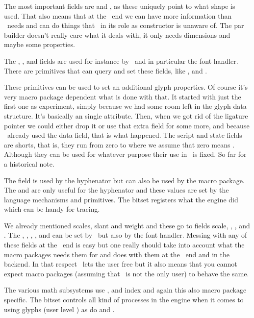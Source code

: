 {The most important fields are  and , as these
uniquely point to what shape is used. That also means that at the \LUA\ end we
can have more information than \TEX\ needs and can do things that \TEX\ in its
role as constructor is unaware of. The par builder doesn't really care what it
deals with, it only needs dimensions and maybe some properties.

The , ,  and  fields are
used for instance by \CONTEXT\ and in particular the font handler. There are
primitives that can query and set these fields, like \typ {\glyphdatafield}, \typ
{\glyphscriptfield} and \typ {\glyphstatefield}.

These primitives can be used to set an additional glyph properties. Of course
it's very macro package dependent what is done with that. It started with just
the first one as experiment, simply because we had some room left in the glyph
data structure. It's basically an single attribute. Then, when we got rid of the
ligature pointer we could either drop it or use that extra field for some more,
and because \CONTEXT\ already used the data field, that is what happened. The
script and state fields are shorts, that is, they run from zero to 
where we assume that zero means . Although they can be used for
whatever purpose their use in \CONTEXT\ is fixed. So far for a historical note.

The  field is used by the hyphenator but can also be used by the
macro package. The  and  are only useful for the
hyphenator and these values are set by the language mechanisms and primitives.
The  bitset registers what the engine did which can be handy for
tracing.

We already mentioned scales, slant and weight and these go to fields \type
{scale}, , ,  and . The
, , , , 
and  can be set by \TEX\ but also by the font handler. Messing
with any of these fields at the \TEX\ end is easy but one really should take into
account what the macro packages needs them for and does with them at the \LUA\
end and in the backend. In that respect \LUAMETATEX\ lets the user free but it
also means that you cannot expect macro packages (assuming that \CONTEXT\ is not
the only user) to behave the same.

The various math subsystems use ,  and \type
{index} and again this also macro package specific. The \type {options} bitset
controls all kind of processes in the engine when it comes to using glyphs (user
level \type {\glyphoptions}) as do \type {control} and \type {hyphenate}.

}
